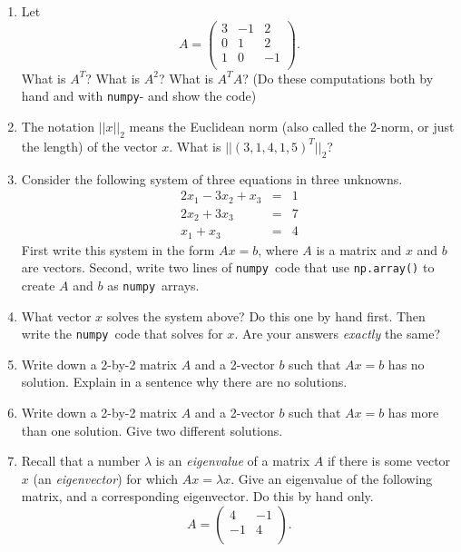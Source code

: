 \documentclass[11pt]{article}
\newcommand{\numpy}{{\tt numpy}}    %
\begin{document}
\begin{enumerate}

\item
Let
$$ A = \left(
\begin{array}{ccc}
3 & -1 & 2 \\ 	
0 & 1 & 2 \\ 
1 & 0 & -1 \\
\end{array} 
\right). $$
What is $A^T$?  What is $A^2$?  What is $A^TA$?
(Do these computations both by hand and with \numpy - and show the code)

\item
The notation $||x||_2$ means the Euclidean norm (also called the 2-norm,
or just the length) of the vector $x$.  
What is $||(3, 1, 4, 1, 5)^T||_2$?

\item
Consider the following system of three equations in three unknowns.
\begin{eqnarray}
 2x_1 - 3x_2 + x_3  & =  & 1 \\
 2x_2 + 3x_3  & =  & 7 \\
 x_1 + x_3  & = & 4 
\end{eqnarray}
First write this system in the form $Ax=b$, 
where $A$ is a matrix and $x$ and $b$ are vectors. 
Second, write two lines of \numpy\ code that use {\tt np.array()} to
create $A$ and $b$ as \numpy\ arrays. 

\item
What vector $x$ solves the system above? Do this one by hand first. Then write the \numpy\ code that solves for $x$. Are your answers \textit{exactly} the same?

\item
Write down a 2-by-2 matrix $A$ and a 2-vector $b$ such that $Ax=b$ has no 
solution.  Explain in a sentence why there are no solutions.

\item
Write down a 2-by-2 matrix $A$ and a 2-vector $b$ such that $Ax=b$ has 
more than one solution.  Give two different solutions.

\item
Recall that a number $\lambda$ is an {\em eigenvalue} 
of a matrix $A$ if there is some vector $x$ 
(an {\em eigenvector}) for which $Ax = \lambda x$.
Give an eigenvalue of the following matrix, and a corresponding eigenvector. Do this by hand only.
$$ A = \left(
\begin{array}{cc}
4 & -1 \\ 	
-1 & 4 \\
\end{array} 
\right). $$


\end{enumerate}
\end{document}
